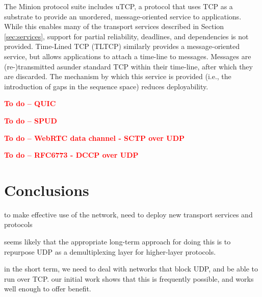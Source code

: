 \documentclass[10pt]{sig-alternate-05-2015}
\newcommand{\todo}[1]{\textbf{\textcolor{red}{To do -- #1}}}
\begin{document}
The Minion protocol suite \cite{nowlan:2012:minion} includes uTCP, a
protocol that uses TCP as a substrate to provide an unordered,
message-oriented service to applications. While this enables many of
the transport services described in Section \ref{sec:services}, support for
partial reliability, deadlines, and dependencies is not provided.
Time-Lined TCP (TLTCP) \cite{mukherjee:2000:timelines} similarly provides a
message-oriented service, but allows applications to attach a time-line
to messages. Messages are (re-)transmitted asunder standard TCP within
their time-line, after which they are discarded. The mechanism by which
this service is provided (i.e., the introduction of gaps in the sequence
space) reduces deployability.

\todo{QUIC}

\todo{SPUD}

\todo{WebRTC data channel - SCTP over UDP}

\todo{RFC6773 - DCCP over UDP}


\section{Conclusions}
\label{sec:conclusions}

to make effective use of the network, need to deploy new transport services
and protocols

seems likely that the appropriate long-term approach for doing this is to
repurpose UDP as a demultiplexing layer for higher-layer protocols.

in the short term, we need to deal with networks that block UDP, and be
able to run over TCP.
our initial work shows that this is frequently possible, and works well
enough to offer benefit.





\end{document}
